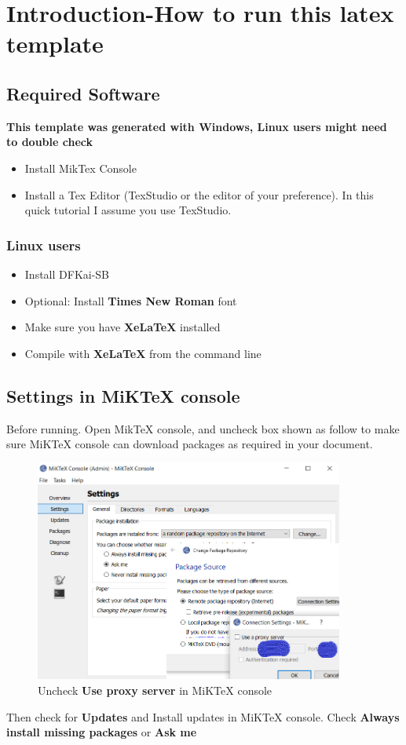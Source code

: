 \chapter{Introduction-How to run this latex template}\label{chapter:introduction}
\section{Required Software}
\textbf{This template was generated with Windows, Linux users might need to double check} 
\begin{itemize}
	\item Install MikTex Console
	\item Install a Tex Editor (TexStudio or the editor of your preference). In this quick tutorial I assume you use TexStudio.
\end{itemize}

\subsection{Linux users}
\begin{itemize}
  \item Install DFKai-SB
  \item Optional: Install \textbf{Times New Roman} font
  \item Make sure you have \textbf{XeLaTeX} installed
  \item Compile with \textbf{XeLaTeX} from the command line
\end{itemize}

\section{Settings in MiKTeX console}
	Before running. Open MikTeX console, and uncheck box shown as follow to make sure MiKTeX console can download packages as required in your document. 
	
	\begin{figure}[ht]                      
		\centering                             
		\includegraphics[width = 4in]{figures/UncheckProxyServer.png}
		\caption{Uncheck \textbf{Use proxy server} in MiKTeX console}
		\label{fig:uncheck_proxy_miktex}                         
	\end{figure} 
	Then check for \textbf{Updates} and Install updates in MiKTeX console. Check \textbf{Always install missing packages} or \textbf{Ask me}

